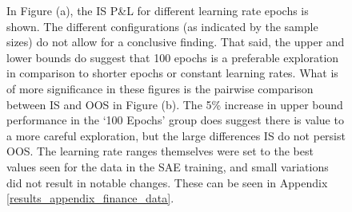 \documentclass[a4paper,11pt,oneside]{article}
\theoremstyle{plain}
\theoremstyle{definition}
\begin{document}
\begin{figure}[H]
{		\newline In Figure (a), the IS P\&L for different learning rate epochs is shown. The different configurations (as indicated by the sample sizes) do not allow for a conclusive finding. That said, the upper and lower bounds do suggest that 100 epochs is a preferable exploration in comparison to shorter epochs or constant learning rates. What is of more significance in these figures is the pairwise comparison between IS and OOS in Figure (b). The 5\% increase in upper bound performance in the `100 Epochs' group does suggest there is value to a more careful exploration, but the large differences IS do not persist OOS. The learning rate ranges themselves were set to the best values seen for the data in the SAE training, and small variations did not result in notable changes. These can be seen in Appendix \ref{results_appendix_finance_data}.}
		\label{figure-actual_pl_lr_epochs}
	\end{figure}
	
\end{document}
